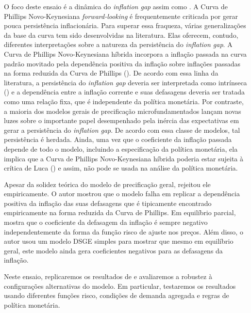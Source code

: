 \documentclass[twoside,a4paper,11pt]{report}
\begin{document}
O foco deste ensaio é a dinâmica do \emph{inflation gap} assim como \citet{yao2010can}. A Curva de Phillips Novo-Keynesiana \emph{forward-looking} é frequentemente criticada por gerar pouca persistência inflacionária. Para superar essa fraqueza, várias generalizações da base da curva tem sido desenvolvidas na literatura. Elas oferecem, contudo, diferentes interpretações sobre a natureza da persistência do \emph{inflation gap}. A Curva de Phillips Novo-Keynesiana híbrida incorpora a inflação passada na curva padrão movitado pela dependência positiva da inflação sobre inflações passadas na forma reduzida da Curva de Phillips (\citet{gali1999inflation,christiano2005nominal}). De acordo com essa linha da literatura, a persistência do \emph{inflation gap} deveria ser interpretada como intrínseca (\citet{fuhrer2005intrinsic}) e a dependência entre a inflação corrente e suas defasagens deveria ser tratada como uma relação fixa, que é independente da política monetária. Por contraste, a maioria dos modelos gerais de precificação microfundamentados lançam novas luzes sobre o importante papel desempenhado pela inércia das expectativas em gerar a persistência do \emph{inflation gap}. De acordo com essa classe de modelos, tal persistência é herdada. Ainda, uma vez que o coeficiente da inflação passada depende de todo o modelo, incluindo a especificação da política monetária, ela implica que a Curva de Phillips Novo-Keynesiana híbrida poderia estar sujeita à crítica de Luca (\citet{lucas1972expectations}) e assim, não pode se usada na análise da política monetária.

Apesar da solidez teórica do modelo de precificação geral, \citet{whelan2007staggered} rejeitou ele empiricamente. O autor mostrou que o modelo falha em replicar a dependência positiva da inflação das suas defasagens que é tipicamente encontrado empiricamente na forma reduzida da Curva de Phillips. Em equilíbrio parcial, \citet{whelan2007staggered} mostra que o coeficiente da defasagem da inflação é sempre negativo independentemente da forma da função risco de ajuste nos preços. Além disso, o autor usou um modelo DSGE simples para mostrar que mesmo em equilíbrio geral, este modelo ainda gera coeficientes negativos para as defasagens da inflação.

Neste ensaio, replicaremos os resultados de \citet{whelan2007staggered} e avaliaremos a robustez à configurações alternativas do modelo. Em particular, testaremos os resultados usando diferentes funções risco, condições de demanda agregada e regras de política monetária. 
\end{document}
